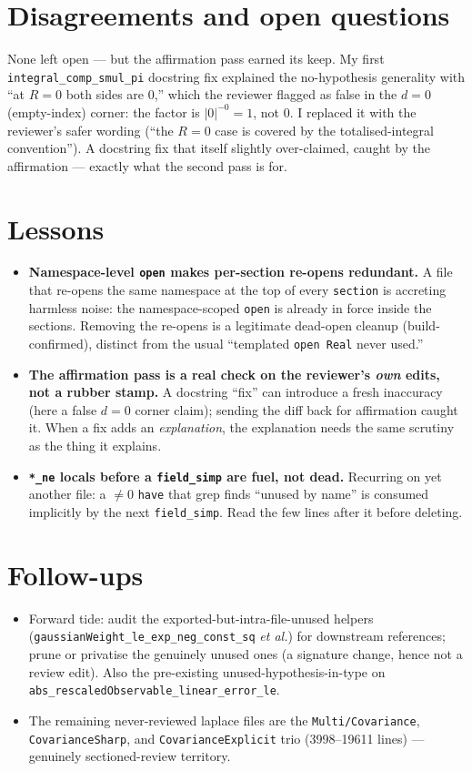 \documentclass[11pt]{article}
\begin{document}
\section{Disagreements and open questions}
None left open --- but the affirmation pass earned its keep. My first
\texttt{integral\_comp\_smul\_pi} docstring fix explained the no-hypothesis generality with ``at
$R=0$ both sides are $0$,'' which the reviewer flagged as false in the $d=0$ (empty-index) corner: the
factor is $|0|^{-0}=1$, not $0$. I replaced it with the reviewer's safer wording (``the $R=0$ case is
covered by the totalised-integral convention''). A docstring fix that itself slightly over-claimed,
caught by the affirmation --- exactly what the second pass is for.

\section{Lessons}
\begin{itemize}[noitemsep]
  \item \textbf{Namespace-level \texttt{open} makes per-section re-opens redundant.} A file that
    re-opens the same namespace at the top of every \texttt{section} is accreting harmless noise: the
    namespace-scoped \texttt{open} is already in force inside the sections. Removing the re-opens is a
    legitimate dead-open cleanup (build-confirmed), distinct from the usual ``templated \texttt{open
    Real} never used.''
  \item \textbf{The affirmation pass is a real check on the reviewer's \emph{own} edits, not a
    rubber stamp.} A docstring ``fix'' can introduce a fresh inaccuracy (here a false $d=0$ corner
    claim); sending the diff back for affirmation caught it. When a fix adds an \emph{explanation}, the
    explanation needs the same scrutiny as the thing it explains.
  \item \textbf{\texttt{*\_ne} locals before a \texttt{field\_simp} are fuel, not dead.} Recurring on
    yet another file: a $\ne0$ \texttt{have} that grep finds ``unused by name'' is consumed implicitly
    by the next \texttt{field\_simp}. Read the few lines after it before deleting.
\end{itemize}

\section{Follow-ups}
\begin{itemize}[noitemsep]
  \item Forward tide: audit the exported-but-intra-file-unused helpers
    (\texttt{gaussianWeight\_le\_exp\_neg\_const\_sq} \emph{et al.}) for downstream references; prune or
    privatise the genuinely unused ones (a signature change, hence not a review edit). Also the
    pre-existing unused-hypothesis-in-type on \texttt{abs\_rescaledObservable\_linear\_error\_le}.
  \item The remaining never-reviewed laplace files are the \texttt{Multi/Covariance},
    \texttt{CovarianceSharp}, and \texttt{CovarianceExplicit} trio (3998--19611 lines) --- genuinely
    sectioned-review territory.
\end{itemize}
\end{document}
